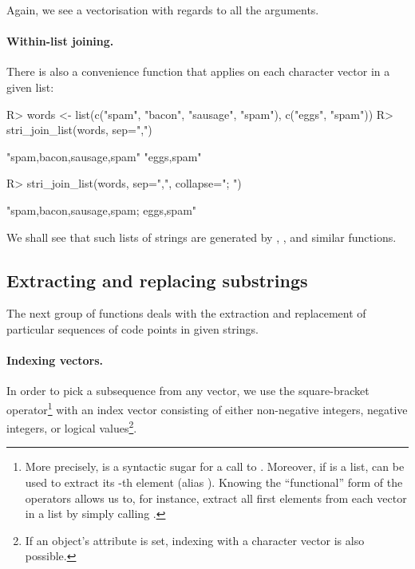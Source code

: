 \documentclass[nojss]{jss}
\begin{document}
\noindent
Again, we see a vectorisation with regards to all the arguments.



\paragraph{Within-list joining.}
There is also a convenience function that applies 
on each character vector in a given list:

\begin{Schunk}
\begin{Sinput}
R> words <- list(c("spam", "bacon", "sausage", "spam"), c("eggs", "spam"))
R> stri_join_list(words, sep=",")
\end{Sinput}
\begin{Soutput}
[1] "spam,bacon,sausage,spam" "eggs,spam"
\end{Soutput}
\begin{Sinput}
R> stri_join_list(words, sep=",", collapse="; ")
\end{Sinput}
\begin{Soutput}
[1] "spam,bacon,sausage,spam; eggs,spam"
\end{Soutput}
\end{Schunk}

\noindent
We shall see that such lists of strings
are generated by , ,
and similar functions.





\subsection{Extracting and replacing substrings}

The next group of functions deals with the extraction and replacement
of particular sequences of code points in given strings.

\paragraph{Indexing vectors.}
In order to pick a subsequence from any  vector,
we use the square-bracket operator\footnote{More precisely, 
is a syntactic sugar for a call to \code{`[`(x, i)}.
Moreover, if  is a list,  can be used to
extract its -th element (alias \code{`[[`(x, i)}).
Knowing the ``functional'' form of the operators allows us to, for instance,
extract all first elements from each vector in a list
by simply calling \code{sapply(x, "[[", 1)}.}
with an index vector consisting of either
non-negative integers, negative integers,
or logical values\footnote{If an object's  attribute is set,
indexing with a character vector is also possible.}.
\end{document}
